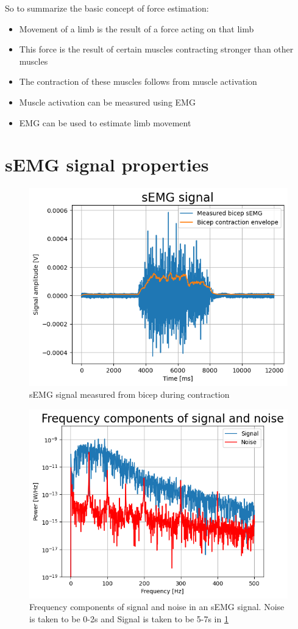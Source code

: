 So to summarize the basic concept of force estimation:
\begin{itemize}
    \item Movement of a limb is the result of a force acting on that limb
    \item This force is the result of certain muscles contracting stronger than other muscles
    \item The contraction of these muscles follows from muscle activation 
    \item Muscle activation can be measured using EMG
    \item EMG can be used to estimate limb movement
\end{itemize}


\section{sEMG signal properties}
\begin{figure}[h!t]
	\begin{center}
		\includegraphics[width=0.7\columnwidth]{images/sEMG_signal_example.png}
	\end{center}
	\caption{sEMG signal measured from bicep during contraction}
	\label{fig:sEMG_signal_example}
\end{figure}

\begin{figure}[h!t]
	\begin{center}
		\includegraphics[width=0.7\columnwidth]{images/sEMG_fft_signalnoise_example.png}
	\end{center}
	\caption{Frequency components of signal and noise in an sEMG signal. 
    Noise is taken to be 0-2s and Signal is taken to be 5-7s in \ref{fig:sEMG_signal_example}}
	\label{fig:sEMG_fft_signalnoise_example}
\end{figure}

